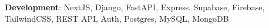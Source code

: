 \textbf{Development}{: NextJS, Django, FastAPI, Express, Supabase, Firebase, TailwindCSS, REST API, Auth, Postgres, MySQL, MongoDB} \\